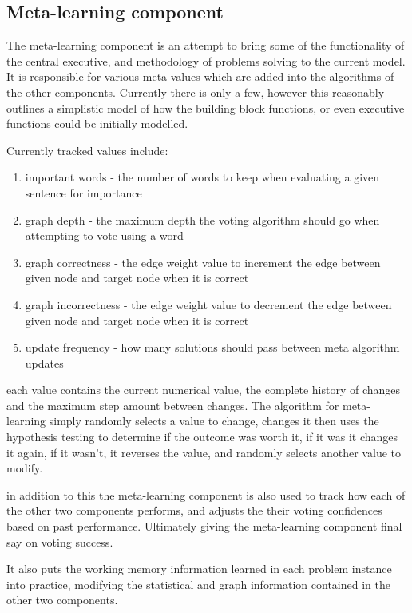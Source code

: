 \subsection{Meta-learning component}
The meta-learning component is an attempt to bring some of the functionality of the central executive, and methodology of problems solving to the current model. It is responsible for various meta-values which are added into the algorithms of the other components. Currently there is only a few, however this reasonably outlines a simplistic model of how the building block functions, or even executive functions could be initially modelled. 

Currently tracked values include:

\begin{enumerate}
	\item important words - the number of words to keep when evaluating a given sentence for importance
	\item graph depth - the maximum depth the voting algorithm should go when attempting to vote using a word
	\item graph correctness - the edge weight value to increment the edge between given node and target node when it is correct
	\item graph incorrectness - the edge weight value to decrement the edge between given node and target node when it is correct
	\item update frequency - how many solutions should pass between meta algorithm updates
\end{enumerate}

each value contains the current numerical value, the complete history of changes and the maximum step amount between changes.  The algorithm for meta-learning simply randomly selects a value to change, changes it then uses the hypothesis testing to determine if the outcome was worth it, if it was it changes it again, if it wasn't, it reverses the value, and randomly selects another value to modify.

in addition to this the meta-learning component is also used to track how each of the other two components performs, and adjusts the their voting confidences based on past performance.  Ultimately giving the meta-learning component final say on voting success.

It also puts the working memory information learned in each problem instance into practice, modifying the statistical and graph information contained in the other two components.

